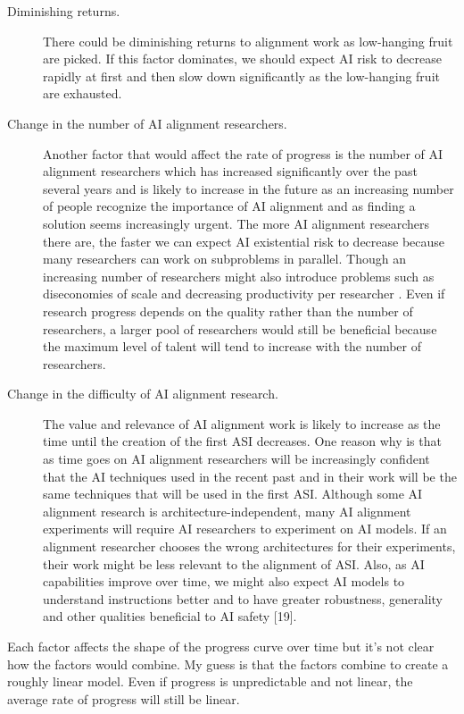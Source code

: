 \documentclass{article}
\begin{document}
\begin{description}
    \item[Diminishing returns.] There could be diminishing returns to alignment work as low-hanging fruit are picked. If this factor dominates, we should expect AI risk to decrease rapidly at first and then slow down significantly as the low-hanging fruit are exhausted.
    \item[Change in the number of AI alignment researchers.] Another factor that would affect the rate of progress is the number of AI alignment researchers which has increased significantly over the past several years and is likely to increase in the future as an increasing number of people recognize the importance of AI alignment and as finding a solution seems increasingly urgent. The more AI alignment researchers there are, the faster we can expect AI existential risk to decrease because many researchers can work on subproblems in parallel. Though an increasing number of researchers might also introduce problems such as diseconomies of scale and decreasing productivity per researcher \cite{environmentalresearch}. Even if research progress depends on the quality rather than the number of researchers, a larger pool of researchers would still be beneficial because the maximum level of talent will tend to increase with the number of researchers.
    \item[Change in the difficulty of AI alignment research.] The value and relevance of AI alignment work is likely to increase as the time until the creation of the first ASI decreases. One reason why is that as time goes on AI alignment researchers will be increasingly confident that the AI techniques used in the recent past and in their work will be the same techniques that will be used in the first ASI. Although some AI alignment research is architecture-independent, many AI alignment experiments will require AI researchers to experiment on AI models. If an alignment researcher chooses the wrong architectures for their experiments, their work might be less relevant to the alignment of ASI. Also, as AI capabilities improve over time, we might also expect AI models to understand instructions better and to have greater robustness, generality and other qualities beneficial to AI safety [19].
\end{description}

Each factor affects the shape of the progress curve over time but it’s not clear how the factors would combine. My guess is that the factors combine to create a roughly linear model. Even if progress is unpredictable and not linear, the average rate of progress will still be linear.
\end{document}

